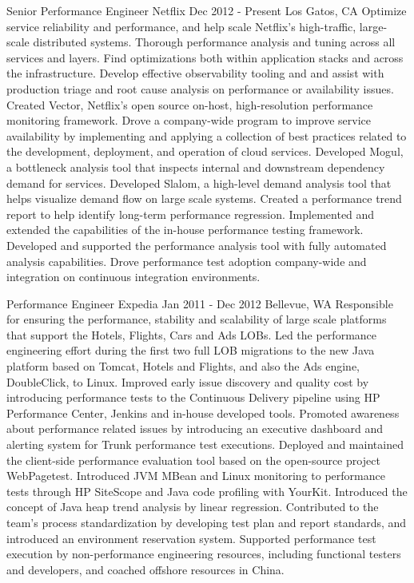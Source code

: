 \documentclass[]{mspier-cv}
\begin{document}
\experienceitem
  {Senior Performance Engineer}
  {Netflix}
  {Dec 2012 - Present}
  {Los Gatos, CA}
  {
    Optimize service reliability and performance, and help scale Netflix's high-traffic, large-scale distributed systems.
    Thorough performance analysis and tuning across all services and layers.
    Find optimizations both within application stacks and across the infrastructure.
    Develop effective observability tooling and and assist with production triage and root cause analysis on performance or availability issues.
    \newline
    Created Vector, Netflix's open source on-host, high-resolution performance monitoring framework.
    Drove a company-wide program to improve service availability by implementing and applying a collection of best practices related to the development, deployment, and operation of cloud services.
    Developed Mogul, a bottleneck analysis tool that inspects internal and downstream dependency demand for services.
    Developed Slalom, a high-level demand analysis tool that helps visualize demand flow on large scale systems.
    Created a performance trend report to help identify long-term performance regression.
    Implemented and extended the capabilities of the in-house performance testing framework.
    Developed and supported the performance analysis tool with fully automated analysis capabilities.
    Drove performance test adoption company-wide and integration on continuous integration environments.
  }

\experienceitem
  {Performance Engineer}
  {Expedia}
  {Jan 2011 - Dec 2012}
  {Bellevue, WA}
  {
    Responsible for ensuring the performance, stability and scalability of large scale platforms that support the Hotels, Flights, Cars and Ads LOBs.
    Led the performance engineering effort during the first two full LOB migrations to the new Java platform based on Tomcat, Hotels and Flights, and also the Ads engine, DoubleClick, to Linux.
    Improved early issue discovery and quality cost by introducing performance tests to the Continuous Delivery pipeline using HP Performance Center, Jenkins and in-house developed tools.
    Promoted awareness about performance related issues by introducing an executive dashboard and alerting system for Trunk performance test executions.
    Deployed and maintained the client-side performance evaluation tool based on the open-source project WebPagetest.
    Introduced JVM MBean and Linux monitoring to performance tests through HP SiteScope and Java code profiling with YourKit.
    Introduced the concept of Java heap trend analysis by linear regression.
    Contributed to the team’s process standardization by developing test plan and report standards, and introduced an environment reservation system.
    Supported performance test execution by non-performance engineering resources, including functional testers and developers, and coached offshore resources in China.
  }
\end{document}
